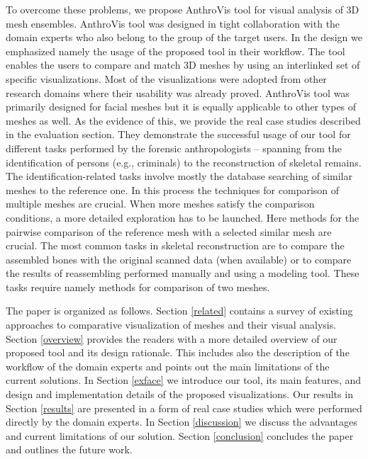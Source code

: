 \documentclass[final,5p,times]{elsarticle}
\begin{document}
To overcome these problems, we propose AnthroVis tool for visual analysis of 3D mesh ensembles.
AnthroVis tool was designed in tight collaboration with the domain experts who also belong to the group of the target users.
In the design we emphasized namely the usage of the proposed tool in their workflow. 
The tool enables the users to compare and match 3D meshes by using an interlinked set of specific visualizations.
Most of the visualizations were adopted from other research domains where their usability was already proved. 
AnthroVis tool was primarily designed for facial meshes but it is equally applicable to other types of meshes as well.
As the evidence of this, we provide the real case studies described in the evaluation section.
They demonstrate the successful usage of our tool for different tasks performed by the forensic anthropologists -- spanning from the identification of persons (e.g., criminals) to the reconstruction of skeletal remains.
The identification-related tasks involve mostly the database \linebreak[4] searching of similar meshes to the reference one. 
In this process the techniques for comparison of multiple meshes are crucial.
When more meshes satisfy the comparison conditions, a more detailed exploration has to be launched.
Here methods for the pairwise comparison of the reference mesh with a selected similar mesh are crucial.  
The most common tasks in skeletal reconstruction are to compare the assembled bones with the original scanned data (when available) or to compare the results of reassembling performed manually and using a modeling tool.
These tasks require namely methods for comparison of two meshes.

The paper is organized as follows. 
Section \ref{related} contains a survey of existing approaches to comparative visualization of meshes and their visual analysis.
Section \ref{overview} provides the readers with a more detailed overview of our proposed tool and its design rationale.
This includes also the description of the workflow of the domain experts and points out the main limitations of the current solutions.
In Section \ref{exface} we introduce our tool, its main features, and design and implementation details of the proposed visualizations.
Our results in Section \ref{results} are presented in a form of real case studies which were performed directly by the domain experts.
In Section \ref{discussion} we discuss the advantages and current limitations of our solution.
Section \ref{conclusion} concludes the paper and outlines the future work.
\end{document}

